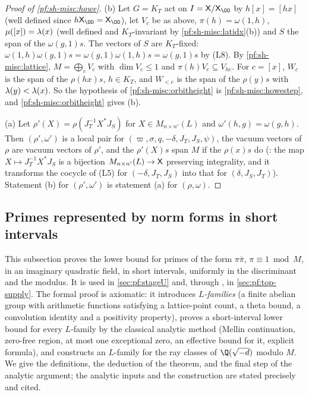 \begin{proof}[Proof of \cref{pf:sh-misc:howe}]
(b) Let $G=K_T$ act on $I=\shmiscX/\shmiscXO$ by $h[x]=[hx]$ (well defined since $h\shmiscXO=\shmiscXO$), let $V_c$ be as above,
$\pi(h)=\omega(1,h)$, $\mu([x])=\lambda(x)$ (well defined and $K_T$-invariant by \cref{pf:sh-misc:latidx}(b)) and $S$ the span of the
$\omega(g,1)s$. The vectors of $S$ are $K_T$-fixed: $\omega(1,h)\omega(g,1)s=\omega(g,1)\omega(1,h)s=\omega(g,1)s$ by (L8). By
\cref{pf:sh-misc:lattice}, $M=\bigoplus_cV_c$ with $\dim V_c\le1$ and $\pi(h)V_c\subseteq V_{hc}$. For $c=[x]$, $W_c$ is the span of the
$\rho(hx)s$, $h\in K_T$, and $W_{<c}$ is the span of the $\rho(y)s$ with $\lambda(y)<\lambda(x)$. So the hypothesis of
\cref{pf:sh-misc:orbitheight} is \cref{pf:sh-misc:howestep}, and \cref{pf:sh-misc:orbitheight} gives (b).

(a) Let $\rho'(X)=\rho(J_T^{-1}X^*J_S)$ for $X\in M_{n\times n'}(L)$ and $\omega'(h,g)=\omega(g,h)$. Then $(\rho',\omega')$ is a local pair for
$(\varpi,\sigma,q,-\delta,J_T,J_S,\psi)$, the vacuum vectors of $\rho$ are vacuum vectors of $\rho'$, and the $\rho'(X)s$ span $M$ if the $\rho(x)s$
do (: the map
$X\mapsto J_T^{-1}X^*J_S$ is a bijection $M_{n\times n'}(L)\to\mathsf X$ preserving integrality, and it transforms the cocycle of (L5) for
$(-\delta,J_T,J_S)$ into that for $(\delta,J_S,J_T)$). Statement (b) for $(\rho',\omega')$ is statement (a) for $(\rho,\omega)$.
\end{proof}

\subsection{Primes represented by norm forms in short intervals}\label{sec:pf:sh-misc:shortnorm}

This subsection proves the lower bound for primes of the form $\pi\bar\pi$, $\pi\equiv1\bmod M$, in an imaginary quadratic field,
in short intervals, uniformly in the discriminant and the modulus. It is used in \cref{sec:pf:stageU} and, through
, in \cref{sec:pf:top-supply}. The formal proof is axiomatic: it introduces
\emph{$L$-families} (a finite abelian group with arithmetic functions satisfying a lattice-point count, a theta bound, a
convolution identity and a positivity property), proves a short-interval lower bound for every $L$-family by the classical
analytic method (Mellin continuation, zero-free region, at most one exceptional zero, an effective bound for it, explicit formula),
and constructs an $L$-family for the ray classes of $\Q(\sqrt{-d})$ modulo $M$. We give the definitions, the deduction of the
theorem, and the final step of the analytic argument; the analytic inputs and the construction are stated precisely and cited.

